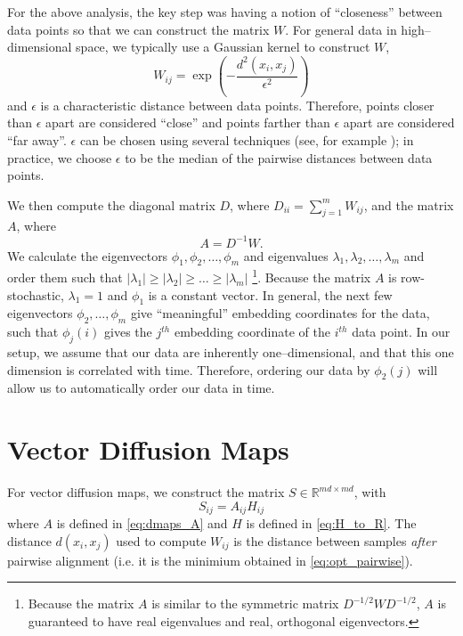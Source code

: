 \documentclass{pnastwo}
\begin{document}
\begin{article}
\begin{materials}
For the above analysis, the key step was having a notion of ``closeness'' between data points so that we can construct the matrix $W$.
%
For general data in high--dimensional space, we typically use a Gaussian kernel to construct $W$,
\begin{equation} \label{eq:dmaps_W}
W_{ij} = \exp \left( -\frac{d^2(x_i, x_j)}{\epsilon^2} \right)
\end{equation}
and $\epsilon$ is a characteristic distance between data points.
%
Therefore, points closer than $\epsilon$ apart are considered ``close'' and points farther than $\epsilon$ apart are considered ``far away''.
%
$\epsilon$ can be chosen using several techniques (see, for example \cite{coifman2008graph}); in practice, we choose $\epsilon$ to be the median of the pairwise distances between data points.

We then compute the diagonal matrix $D$, where $D_{ii} = \sum_{j=1}^{m} W_{ij}$, and the matrix $A$, where
\begin{equation} \label{eq:dmaps_A}
A = D^{-1} W.
\end{equation} 
%
We calculate the eigenvectors $\phi_1, \phi_2, \dots, \phi_m$ and eigenvalues $\lambda_1, \lambda_2, \dots, \lambda_m$ and order them such that $|\lambda_1| \ge |\lambda_2| \ge \dots \ge |\lambda_m|$ \footnote{Because the matrix $A$ is similar to the symmetric matrix $D^{-1/2} W D^{-1/2}$, $A$ is guaranteed to have real eigenvalues and real, orthogonal eigenvectors.}. 
%
Because the matrix $A$ is row-stochastic, $\lambda_1=1$ and $\phi_1$ is a constant vector.
%
In general, the next few eigenvectors $\phi_2, \dots, \phi_m$ give ``meaningful'' embedding coordinates for the data, such that $\phi_j(i)$ gives the $j^{th}$ embedding coordinate of the $i^{th}$ data point. 
%
In our setup, we assume that our data are inherently one--dimensional, and that this one dimension is correlated with time.
%
Therefore, ordering our data by $\phi_2(j)$ will allow us to automatically order our data in time. 



\section{Vector Diffusion Maps}

For vector diffusion maps, we construct the matrix $S \in \mathbb{R}^{md \times md}$, with
\begin{equation}
	S_{ij} = A_{ij} H_{ij}
\end{equation}
%
where $A$ is defined in \eqref{eq:dmaps_A} and $H$ is defined in \eqref{eq:H_to_R}.
%
The distance $d(x_i, x_j)$ used to compute $W_{ij}$ is the distance between samples {\em after} pairwise alignment (i.e. it is the minimium obtained in \eqref{eq:opt_pairwise}). 


\end{materials}
\end{article}
\end{document}

